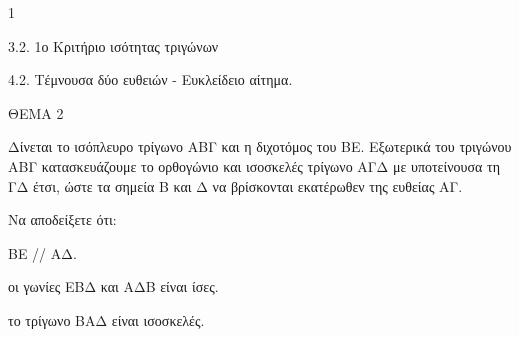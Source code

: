 \begin{ylh}{1}
    \item 3.2. 1ο Κριτήριο ισότητας τριγώνων
    \item 4.2. Τέμνουσα δύο ευθειών - Ευκλείδειο αίτημα.
\end{ylh}

ΘΕΜΑ 2

Δίνεται το ισόπλευρο τρίγωνο ΑΒΓ και η διχοτόμος του ΒΕ. Εξωτερικά του τριγώνου ΑΒΓ κατασκευάζουμε το ορθογώνιο και ισοσκελές τρίγωνο ΑΓΔ με υποτείνουσα τη ΓΔ έτσι, ώστε τα σημεία Β και Δ να βρίσκονται εκατέρωθεν της ευθείας ΑΓ.

Να αποδείξετε ότι:

\begin{alist}
\item ΒΕ // ΑΔ. 

\item οι γωνίες ΕΒΔ και ΑΔΒ είναι ίσες. 

\item το τρίγωνο ΒΑΔ είναι ισοσκελές. 


\begin{center}
\end{center}
\end{alist}
